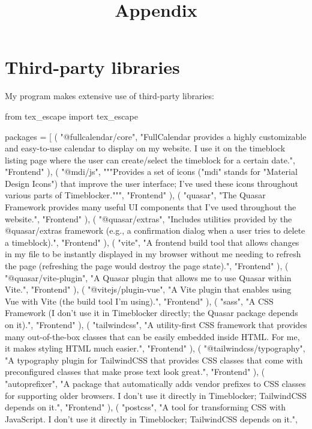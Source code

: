 \documentclass[12pt]{report}
\title{Appendix}
\begin{document}
\centerline{\textcolor{msblue}{
		\textbf{\fontsize{13}{13}\MyTitle}
	}}

\section*{Third-party libraries}
My program makes extensive use of third-party libraries:

\begin{pycode}
from tex_escape import tex_escape

packages = [
	(
		"@fullcalendar/core",
		"FullCalendar provides a highly customizable and easy-to-use calendar to display on my website. I use it on the timeblock listing page where the user can create/select the timeblock for a certain date.",
		"Frontend"
	),
	(
		"@mdi/js",
		"""Provides a set of icons ("mdi" stands for "Material Design Icons") that improve the user interface; I've used these icons throughout various parts of Timeblocker.""",
		"Frontend"
	),
	(
		"quasar",
		"The Quasar Framework provides many useful UI components that I've used throughout the website.",
		"Frontend"
	),
	(
		"@quasar/extras",
		"Includes utilities provided by the @quasar/extras framework (e.g., a confirmation dialog when a user tries to delete a timeblock).",
		"Frontend"
	),
	(
		"vite",
		"A frontend build tool that allows changes in my file to be instantly displayed in my browser without me needing to refresh the page (refreshing the page would destroy the page state).",
		"Frontend"
	),
	(
		"@quasar/vite-plugin",
		"A Quasar plugin that allows me to use Quasar within Vite.",
		"Frontend"
	),
	(
		"@vitejs/plugin-vue",
		"A Vite plugin that enables using Vue with Vite (the build tool I'm using).",
		"Frontend"
	),
	(
		"sass",
		"A CSS Framework (I don't use it in Timeblocker directly; the Quasar package depends on it).",
		"Frontend"
	),
	(
		"tailwindcss",
		"A utility-first CSS framework that provides many out-of-the-box classes that can be easily embedded inside HTML. For me, it makes styling HTML much easier.",
		"Frontend"
	),
	(
		"@tailwindcss/typography",
		"A typography plugin for TailwindCSS that provides CSS classes that come with preconfigured classes that make prose text look great.",
		"Frontend"
	),
	(
		"autoprefixer",
		"A package that automatically adds vendor prefixes to CSS classes for supporting older browsers. I don't use it directly in Timeblocker; TailwindCSS depends on it.",
		"Frontend"
	),
	(
		"postcss",
		"A tool for transforming CSS with JavaScript. I don't use it directly in Timeblocker; TailwindCSS depends on it.",

\end{pycode}
\end{document}
